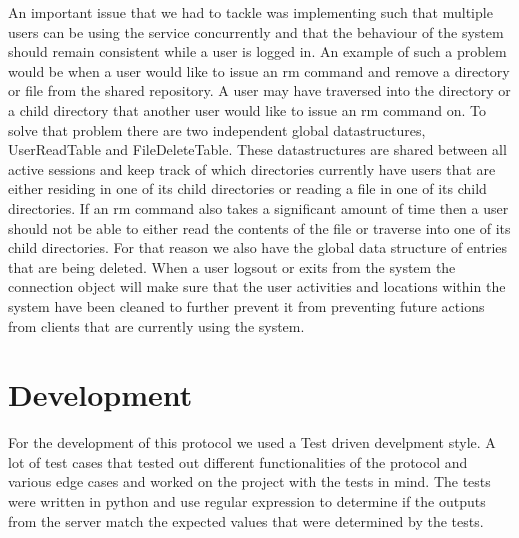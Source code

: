 \documentclass{article}
\begin{document}
An important issue that we had to tackle was implementing such that multiple users can be using the service concurrently and that the behaviour of the system
should remain consistent while a user is logged in. An example of such a problem would be when a user would like to issue an rm command and remove a directory 
or file from the shared repository. A user may have traversed into the directory or a child directory that another user would like to issue an rm command on.
To solve that problem there are two independent global datastructures, UserReadTable and FileDeleteTable. These datastructures are shared between all active sessions and keep track
of which directories currently have users that are either residing in one of its child directories or reading a file in one of its child directories. If an rm command also 
takes a significant amount of time then a user should not be able to either read the contents of the file or traverse into one of its child directories. For that reason we also have
the global data structure of entries that are being deleted. When a user logsout or exits from the system the connection object will make sure that the user activities and locations within the system have been cleaned 
to further prevent it from preventing future actions from clients that are currently using the system. 



\section{Development}

For the development of this protocol we used a Test driven develpment style. A lot of test cases that tested out different functionalities of the protocol and 
various edge cases and worked on the project with the tests in mind. The tests were written in python and use regular expression to determine if the outputs from
the server match the expected values that were determined by the tests.
\end{document}
